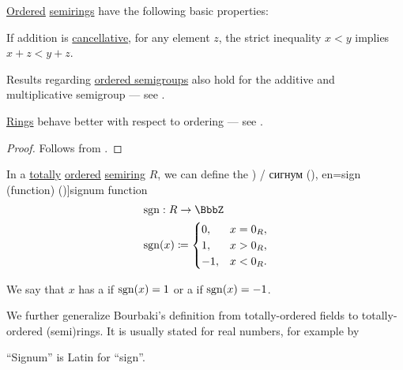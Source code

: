 \begin{proposition}\label{thm:def:ordered_semiring}
  \hyperref[def:ordered_semiring]{Ordered} \hyperref[def:semiring]{semirings} have the following basic properties:
  \begin{thmenum}
     If addition is \hyperref[def:binary_operation/cancellative]{cancellative}, for any element \( z \), the strict inequality \( x < y \) implies \( x + z < y + z \).
  \end{thmenum}
\end{proposition}
\begin{comments}
  \item Results regarding \hyperref[def:ordered_semigroup]{ordered semigroups} also hold for the additive and multiplicative semigroup --- see .
  \item \hyperref[def:ring]{Rings} behave better with respect to ordering --- see .
\end{comments}
\begin{proof}
   Follows from .
\end{proof}

\begin{definition}\label{def:signum}
  In a \hyperref[def:totally_ordered_set]{totally} \hyperref[def:ordered_semiring]{ordered} \hyperref[def:semiring]{semiring} \( R \), we can define the \term[ru=знак (\cite[208]{АлександровМаркушевичХинчинИПр1952ЭнциклопедияТом3}) / сигнум (\cite[100]{Зорич2019АнализЧасть1}), en=sign (function) (\cite[\S 2.2(c)]{Schechter1997AnalysisHandbook})]{signum} function
  \begin{equation*}
    \begin{aligned}
      &\sgn: R \to \BbbZ \\
      &\sgn(x) \coloneqq \begin{cases}
        0,  &x = 0_R, \\
        1,  &x > 0_R, \\
        -1, &x < 0_R.
      \end{cases}
    \end{aligned}
  \end{equation*}

  We say that \( x \) has a  if \( \operatorname{sgn}(x) = 1 \) or a  if \( \operatorname{sgn}(x) = -1 \).
\end{definition}
\begin{comments}
  \item We further generalize Bourbaki's definition from totally-ordered fields to totally-ordered (semi)rings. It is usually stated for real numbers, for example by

  \item \enquote{Signum} is Latin for \enquote{sign}.
\end{comments}

